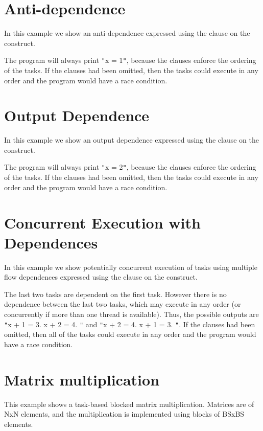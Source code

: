 \section{Anti-dependence}

In this example we show an anti-dependence expressed using the  
clause on the  construct.



The program will always print \texttt{"}x = 1\texttt{"}, because the  
clauses enforce the ordering of the tasks. If the  clauses had been 
omitted, then the tasks could execute in any order and the program would have a 
race condition.

\section{Output Dependence}

In this example we show an output dependence expressed using the  
clause on the  construct.



The program will always print \texttt{"}x = 2\texttt{"}, because the  
clauses enforce the ordering of the tasks. If the  clauses had been 
omitted, then the tasks could execute in any order and the program would have a 
race condition.

\section{Concurrent Execution with Dependences}

In this example we show potentially concurrent execution of tasks using multiple 
flow dependences expressed using the  clause on the  
construct.



The last two tasks are dependent on the first task. However there is no dependence 
between the last two tasks, which may execute in any order (or concurrently if 
more than one thread is available). Thus, the possible outputs are \texttt{"}x 
+ 1 = 3. x + 2 = 4. \texttt{"} and \texttt{"}x + 2 = 4. x + 1 = 3. \texttt{"}. 
If the  clauses had been omitted, then all of the tasks could execute 
in any order and the program would have a race condition.

\section{Matrix multiplication}

This example shows a task-based blocked matrix multiplication. Matrices are of 
NxN elements, and the multiplication is implemented using blocks of BSxBS elements.




